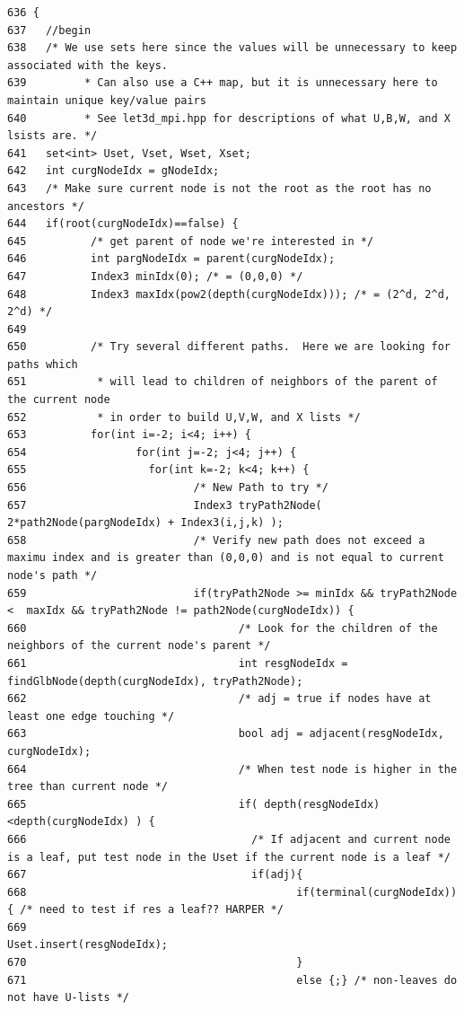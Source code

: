 \footnotesize\begin{verbatim}636 {
637   //begin
638   /* We use sets here since the values will be unnecessary to keep associated with the keys.
639         * Can also use a C++ map, but it is unnecessary here to maintain unique key/value pairs
640         * See let3d_mpi.hpp for descriptions of what U,B,W, and X lsists are. */
641   set<int> Uset, Vset, Wset, Xset;  
642   int curgNodeIdx = gNodeIdx;
643   /* Make sure current node is not the root as the root has no ancestors */
644   if(root(curgNodeIdx)==false) {
645          /* get parent of node we're interested in */
646          int pargNodeIdx = parent(curgNodeIdx);
647          Index3 minIdx(0); /* = (0,0,0) */
648          Index3 maxIdx(pow2(depth(curgNodeIdx))); /* = (2^d, 2^d, 2^d) */
649          
650          /* Try several different paths.  Here we are looking for paths which
651           * will lead to children of neighbors of the parent of the current node
652           * in order to build U,V,W, and X lists */
653          for(int i=-2; i<4; i++) {
654                 for(int j=-2; j<4; j++) {
655                   for(int k=-2; k<4; k++) {
656                          /* New Path to try */
657                          Index3 tryPath2Node( 2*path2Node(pargNodeIdx) + Index3(i,j,k) );
658                          /* Verify new path does not exceed a maximu index and is greater than (0,0,0) and is not equal to current node's path */
659                          if(tryPath2Node >= minIdx && tryPath2Node <  maxIdx && tryPath2Node != path2Node(curgNodeIdx)) {
660                                 /* Look for the children of the neighbors of the current node's parent */
661                                 int resgNodeIdx = findGlbNode(depth(curgNodeIdx), tryPath2Node);
662                                 /* adj = true if nodes have at least one edge touching */
663                                 bool adj = adjacent(resgNodeIdx, curgNodeIdx);
664                                 /* When test node is higher in the tree than current node */
665                                 if( depth(resgNodeIdx)<depth(curgNodeIdx) ) {
666                                   /* If adjacent and current node is a leaf, put test node in the Uset if the current node is a leaf */
667                                   if(adj){
668                                          if(terminal(curgNodeIdx)){ /* need to test if res a leaf?? HARPER */
669                                                 Uset.insert(resgNodeIdx);
670                                          }
671                                          else {;} /* non-leaves do not have U-lists */

\end{verbatim}
